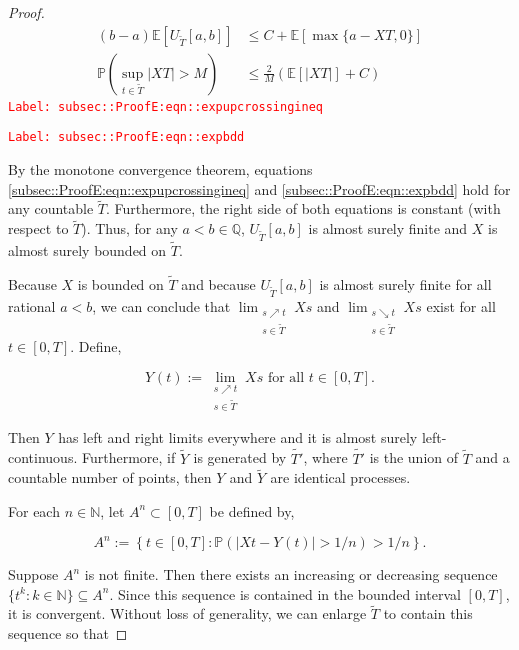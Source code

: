 \documentclass[12pt]{article}
\newcommand{\mb}{\mathbb}
\newcommand{\te}{\text}
\newcommand{\tr}{\textcolor{red}}
\newcommand{\labe}[1]{\tr{\texttt{Label: #1}}}
\newcommand{\ind}{\hspace{24pt}}
\newcommand{\pr}{\mb{P}}							%
\newcommand{\ex}[1]{\mb{E}\left[#1\right]}			%
\newcommand{\T}{T}								%
\renewcommand{\t}{t}							%
\renewcommand{\tt}{s}							%
\newcommand{\X}{X}								%
\newcommand{\const}{C}							%
\newcommand{\sln}[1]{^{#1}}						%
\renewcommand{\it}{k}								%
\newcommand{\rxvtt}[2]{Y_{#1}{(#2)}}				%
\newcommand{\rxvtts}[2]{Y_{#1}{#2}}					%
\newcommand{\alt}{\widetilde}						%
\newcommand{\typset}{A}							%
\begin{document}
\begin{proof}
\begin{align}
(b-a)\ex{U_{\alt{T}}[a,b]} &\leq \const{} + \ex{\max\{a-\X{}{\T},0\}}
\label{subsec::ProofE:eqn::expupcrossingineq}\\
\pr\left(\sup_{\t\in\alt{T}} |\X{}{\T}| > M\right) &\leq \frac{2}{M}\left(\ex{|\X{}{\T}|} + \const{}\right)
\label{subsec::ProofE:eqn::expbdd}
\end{align}
\labe{subsec::ProofE:eqn::expupcrossingineq}

\labe{subsec::ProofE:eqn::expbdd}

By the monotone convergence theorem, equations \eqref{subsec::ProofE:eqn::expupcrossingineq} and \eqref{subsec::ProofE:eqn::expbdd} hold for any countable \(\alt{T}\). Furthermore, the right side of both equations is constant (with respect to \(\alt{T}\)). Thus, for any \(a < b \in \mb{Q}\), \(U_{\alt{T}}[a,b]\) is almost surely finite and \(\X{}{}\) is almost surely bounded on \(\alt{T}\).

\ind Because \(\X{}{}\) is bounded on \(\alt{T}\) and because \(U_{\alt{T}}[a,b]\) is almost surely finite for all rational \(a < b\), we can conclude that \(\lim_{\substack{\tt \nearrow \t\\ \tt \in \alt{T}}} \X{}{\tt}\) and \(\lim_{\substack{\tt \searrow \t\\ \tt \in \alt{T}}} \X{}{\tt}\) exist for all \(\t \in [0,\T]\). Define,

\[\rxvtt{}{\t} := \lim_{\substack{\tt \nearrow \t\\\tt \in \alt{T}}} \X{}{\tt}\te{ for all } \t \in [0,\T].\]

Then \(\rxvtts{}{}\) has left and right limits everywhere and it is almost surely left-continuous. Furthermore, if \(\alt{\rxvtts{}{}}\) is generated by \(\alt{T'}\), where \(\alt{T'}\) is the union of \(\alt{T}\) and a countable number of points, then \(\rxvtts{}{}\) and \(\alt{\rxvtts{}{}}\) are identical processes. 

\ind For each \(n \in \mb{N}\), let \(\typset\sln{n} \subset [0,\T]\) be defined by,

\[\typset\sln{n} := \left\{\t\in [0,\T]: \pr\left(|\X{}{\t} - \rxvtt{}{\t}| > 1/n\right) > 1/n\right\}.\] 

Suppose \(\typset\sln{n}\) is not finite. Then there exists an increasing or decreasing sequence \(\{\t\sln{\it}:\it\in \mb{N}\}\subseteq \typset\sln{n}\). Since this sequence is contained in the bounded interval \([0,\T]\), it is convergent. Without loss of generality, we can enlarge \(\alt{T}\) to contain this sequence so that


\end{proof}
\end{document}
